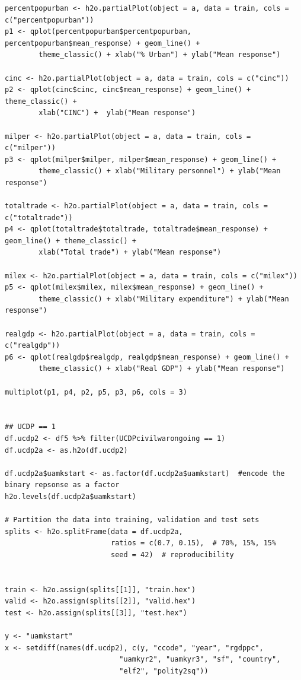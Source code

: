 \begin{verbatim}
percentpopurban <- h2o.partialPlot(object = a, data = train, cols = c("percentpopurban"))
p1 <- qplot(percentpopurban$percentpopurban, percentpopurban$mean_response) + geom_line() +
        theme_classic() + xlab("% Urban") + ylab("Mean response")
        
cinc <- h2o.partialPlot(object = a, data = train, cols = c("cinc"))
p2 <- qplot(cinc$cinc, cinc$mean_response) + geom_line() + theme_classic() + 
        xlab("CINC") +  ylab("Mean response")

milper <- h2o.partialPlot(object = a, data = train, cols = c("milper"))
p3 <- qplot(milper$milper, milper$mean_response) + geom_line() +
        theme_classic() + xlab("Military personnel") + ylab("Mean response")

totaltrade <- h2o.partialPlot(object = a, data = train, cols = c("totaltrade"))
p4 <- qplot(totaltrade$totaltrade, totaltrade$mean_response) + geom_line() + theme_classic() +
        xlab("Total trade") + ylab("Mean response")

milex <- h2o.partialPlot(object = a, data = train, cols = c("milex"))
p5 <- qplot(milex$milex, milex$mean_response) + geom_line() +
        theme_classic() + xlab("Military expenditure") + ylab("Mean response")
        
realgdp <- h2o.partialPlot(object = a, data = train, cols = c("realgdp"))
p6 <- qplot(realgdp$realgdp, realgdp$mean_response) + geom_line() +
        theme_classic() + xlab("Real GDP") + ylab("Mean response")

multiplot(p1, p4, p2, p5, p3, p6, cols = 3)


## UCDP == 1
df.ucdp2 <- df5 %>% filter(UCDPcivilwarongoing == 1)
df.ucdp2a <- as.h2o(df.ucdp2)

df.ucdp2a$uamkstart <- as.factor(df.ucdp2a$uamkstart)  #encode the binary repsonse as a factor
h2o.levels(df.ucdp2a$uamkstart)

# Partition the data into training, validation and test sets
splits <- h2o.splitFrame(data = df.ucdp2a, 
                         ratios = c(0.7, 0.15),  # 70%, 15%, 15%
                         seed = 42)  # reproducibility


train <- h2o.assign(splits[[1]], "train.hex")   
valid <- h2o.assign(splits[[2]], "valid.hex") 
test <- h2o.assign(splits[[3]], "test.hex")

y <- "uamkstart"
x <- setdiff(names(df.ucdp2), c(y, "ccode", "year", "rgdppc",
                           "uamkyr2", "uamkyr3", "sf", "country",
                           "elf2", "polity2sq")) 


\end{verbatim}
